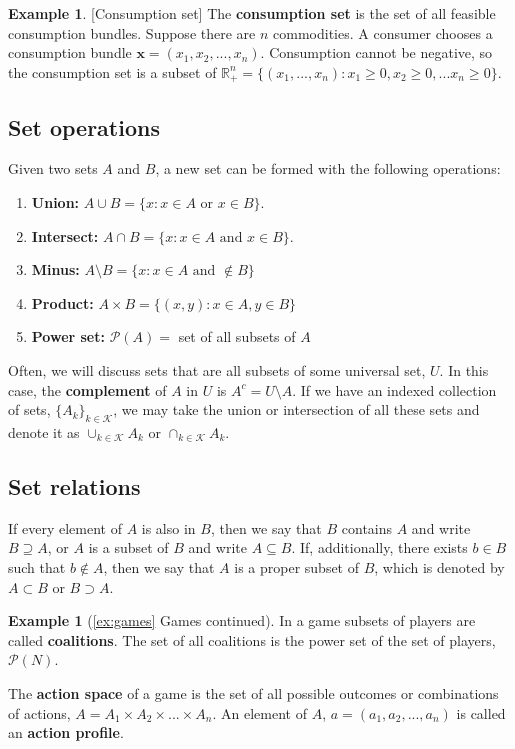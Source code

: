 \documentclass[12pt,reqno]{amsart}
\def\Re{\mathbb{R}}
\theoremstyle{definition}
\newtheorem{example}{Example}[section]
\newtheorem*{example*}{Example}
\begin{document}
\begin{example}\label{ex:conset}[Consumption set]
  The \textbf{consumption set} is the set of all feasible consumption
  bundles. Suppose there are $n$ commodities. A consumer chooses a
  consumption bundle $\mathbf{x} = (x_1, x_2, ..., x_n)$. Consumption
  cannot be negative, so the consumption set is a subset of $\Re^n_+ =
  \{(x_1, ..., x_n) : x_1 \geq 0, x_2 \geq 0, ... x_n \geq 0 \}$.
\end{example}


\subsection{Set operations}

Given two sets $A$ and $B$, a new set can be formed with the following
operations:
\begin{enumerate}
\item \textbf{Union:} $A \cup B = \{x: x\in A \text{ or } x \in B\}$.
\item \textbf{Intersect:} $A \cap B = \{x: x \in A \text{ and } x \in
  B\}$. 
\item \textbf{Minus:} $A \setminus B = \{ x: x\in A \text{ and }
  \not\in B \}$
\item \textbf{Product:} $A \times B = \{(x,y): x \in A, y \in B \}$
\item \textbf{Power set:} $\mathcal{P}(A) =$ set of all subsets of $A$ 
\end{enumerate}
Often, we will discuss sets that are all subsets of some universal
set, $U$. In this case, the \textbf{complement} of $A$ in $U$ is $A^c
= U \setminus A$. If we have an indexed collection of sets, $\{A_k
\}_{k \in \mathcal{K}}$, we may take the union or intersection of all
these sets and denote it as $\cup_{k \in \mathcal{K}} A_k $ or
$\cap_{k \in \mathcal{K}} A_k$.

\subsection{Set relations}
If every element of $A$ is also in $B$, then we say that
$B$ contains $A$ and write $B \supseteq A$, or $A$ is a subset of $B$
and write $A \subseteq B$. If, additionally, there exists $b \in B$
such that $b \not\in A$, then we say that $A$ is a proper subset of $B$,
which is denoted by $A \subset B$ or $B \supset A$. 

\begin{example*}[\ref{ex:games} Games continued] 
  In a game subsets of players are called \textbf{coalitions}. The set
  of all coalitions is the power set of the set of players,
  $\mathcal{P}(N)$. 

  The \textbf{action space} of a game is the set of all possible
  outcomes or combinations of actions, $A = A_1 \times A_2 \times
  ... \times A_n$. An element of $A$, $a = (a_1, a_2, ..., a_n)$ is
  called an \textbf{action profile}. 
\end{example*}
\end{document}
